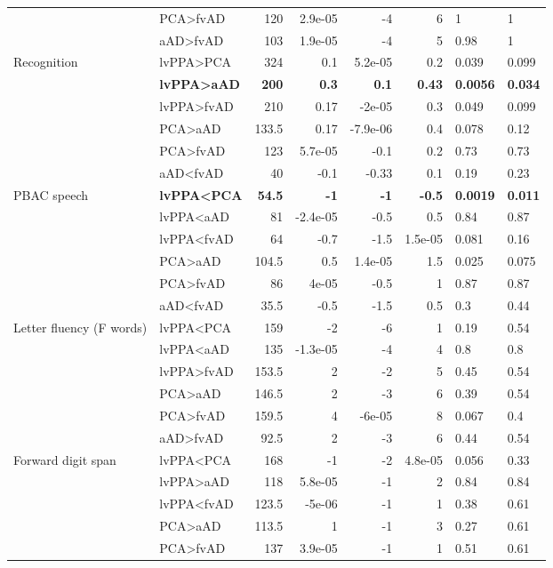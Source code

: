 \documentclass[]{article}
\begin{document}
\begin{table}[ht]
{\begin{tabular}{llrrrrll}
   & PCA>fvAD & 120 & 2.9e-05 & -4 & 6 & 1 & 1 \\ 
   & aAD>fvAD & 103 & 1.9e-05 & -4 & 5 & 0.98 & 1 \\ 
  Recognition & lvPPA>PCA & 324 & 0.1 & 5.2e-05 & 0.2 & 0.039 & 0.099 \\ 
   & \textbf{lvPPA>aAD} & \textbf{200} & \textbf{0.3} & \textbf{0.1} & \textbf{0.43} & \textbf{0.0056} & \textbf{0.034} \\ 
   & lvPPA>fvAD & 210 & 0.17 & -2e-05 & 0.3 & 0.049 & 0.099 \\ 
   & PCA>aAD & 133.5 & 0.17 & -7.9e-06 & 0.4 & 0.078 & 0.12 \\ 
   & PCA>fvAD & 123 & 5.7e-05 & -0.1 & 0.2 & 0.73 & 0.73 \\ 
   & aAD<fvAD & 40 & -0.1 & -0.33 & 0.1 & 0.19 & 0.23 \\ 
  PBAC speech & \textbf{lvPPA<PCA} & \textbf{54.5} & \textbf{-1} & \textbf{-1} & \textbf{-0.5} & \textbf{0.0019} & \textbf{0.011} \\ 
   & lvPPA<aAD & 81 & -2.4e-05 & -0.5 & 0.5 & 0.84 & 0.87 \\ 
   & lvPPA<fvAD & 64 & -0.7 & -1.5 & 1.5e-05 & 0.081 & 0.16 \\ 
   & PCA>aAD & 104.5 & 0.5 & 1.4e-05 & 1.5 & 0.025 & 0.075 \\ 
   & PCA>fvAD & 86 & 4e-05 & -0.5 & 1 & 0.87 & 0.87 \\ 
   & aAD<fvAD & 35.5 & -0.5 & -1.5 & 0.5 & 0.3 & 0.44 \\ 
  Letter fluency (F words) & lvPPA<PCA & 159 & -2 & -6 & 1 & 0.19 & 0.54 \\ 
   & lvPPA<aAD & 135 & -1.3e-05 & -4 & 4 & 0.8 & 0.8 \\ 
   & lvPPA>fvAD & 153.5 & 2 & -2 & 5 & 0.45 & 0.54 \\ 
   & PCA>aAD & 146.5 & 2 & -3 & 6 & 0.39 & 0.54 \\ 
   & PCA>fvAD & 159.5 & 4 & -6e-05 & 8 & 0.067 & 0.4 \\ 
   & aAD>fvAD & 92.5 & 2 & -3 & 6 & 0.44 & 0.54 \\ 
  Forward digit span & lvPPA<PCA & 168 & -1 & -2 & 4.8e-05 & 0.056 & 0.33 \\ 
   & lvPPA>aAD & 118 & 5.8e-05 & -1 & 2 & 0.84 & 0.84 \\ 
   & lvPPA<fvAD & 123.5 & -5e-06 & -1 & 1 & 0.38 & 0.61 \\ 
   & PCA>aAD & 113.5 & 1 & -1 & 3 & 0.27 & 0.61 \\ 
   & PCA>fvAD & 137 & 3.9e-05 & -1 & 1 & 0.51 & 0.61 \\ 

\end{tabular}}
\end{table}
\end{document}
